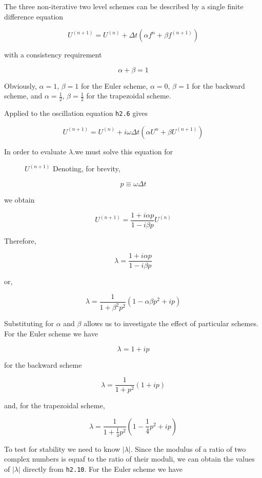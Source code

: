 The three non-iterative two level schemes can be described by a single
finite difference equation

{\[U^{( n + 1 )} = U^{\left( n \right)} + \Delta t\left( \alpha f^{n} + \beta f^{\left( n + 1 \right)} \right)\]}

with a consistency requirement

\[\alpha + \beta = 1\]

Obviously, \(\alpha = 1\), \(\beta = 1\) for the Euler scheme,
\(\alpha = 0\), \(\beta = 1\) for the backward scheme, and
\(\alpha = \frac{1}{2}\), \(\beta = \frac{1}{2}\) for the trapezoidal
scheme.

Applied to the oscillation equation \texttt{h2.6} gives

{\[U^{\left( n + 1 \right)} = U^{(n)} + i\omega\Delta t \left( \alpha U^n  + \beta U^{( n + 1 )}\right)\]}

\begin{description}
\item[In order to evaluate \(\lambda\).we must solve this equation for]
\(U^{\left( n + 1 \right)}\) Denoting, for brevity,
\end{description}

{\[p \equiv \omega\Delta t\]}

we obtain

{\[U^{\left( n + 1 \right)} = \frac{1 + i\alpha p}{1 - i\beta p}U^{\left( n \right)}\]}

Therefore,

{\[\lambda = \frac{1 + i\alpha p}{1 - i\beta p}\]}

or,

\[\lambda = \frac{1}{1 + \beta^2 p^2}( 1 - \alpha\beta p^{2} + ip )\]

Substituting for \(\alpha\) and \(\beta\) allows us to investigate the
effect of particular schemes. For the Euler scheme we have

{\[\lambda = 1 + ip\]}

for the backward scheme

{\[\lambda = \frac{1}{1 + p^{2}}\left( 1 + ip \right)\]}

and, for the trapezoidal scheme,

{\[\lambda = \frac{1}{1 + \frac{1}{4}p^{2}}\left( 1 - \frac{1}{4}p^{2} + ip \right)\]}

To test for stability we need to know \(| \lambda |\). Since the modulus
of a ratio of two complex numbers is equaf to the ratio of their moduli,
we can obtain the values of \(| \lambda |\) directly from
\texttt{h2.10}. For the Euler scheme we have

